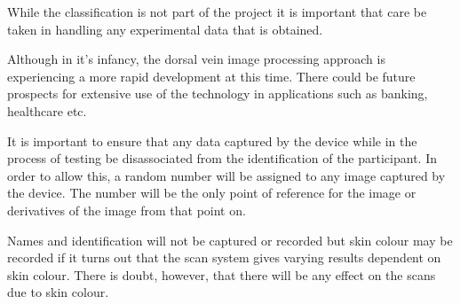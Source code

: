 \documentclass[10pt,a4paper,twoside,noindent]{report}
\begin{document}
While the classification is not part of the project it is important that care be taken in handling any experimental data that is obtained.

Although in it's infancy, the dorsal vein image processing approach is experiencing a more rapid development at this time. There could be future prospects for extensive use of the technology in applications such as banking, healthcare etc.

It is important to ensure that any data captured by the device while in the process of testing be disassociated from the identification of the participant. In order to allow this, a random number will be assigned to any image captured by the device. The number will be the only point of reference for the image or derivatives of the image from that point on.

Names and identification will not be captured or recorded but skin colour may be recorded if it turns out that the scan system gives varying results dependent on skin colour. There is doubt, however, that there will be any effect on the scans due to skin colour.
\end{document}
